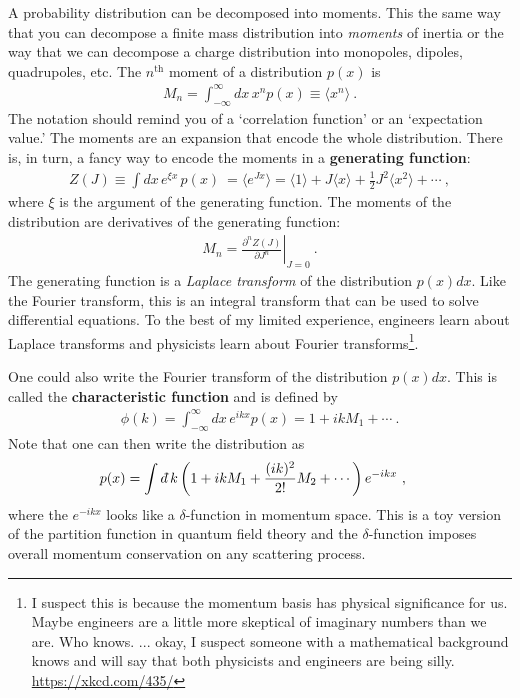 A probability distribution can be decomposed into moments. This the same way that you can decompose a finite mass distribution into \emph{moments} of inertia or the way that we can decompose a charge distribution into monopoles, dipoles, quadrupoles, etc. The $n^\text{th}$ moment of a distribution $p(x)$ is
\begin{align}
	M_n = \int_{-\infty}^\infty dx \, x^n p(x) \equiv \langle x^n \rangle \ .
\end{align}
The notation should remind you of a `correlation function' or an `expectation value.' The moments are an expansion that encode the whole distribution. There is, in turn, a fancy way to encode the moments in a \textbf{generating function}:
\begin{align}
	Z(J) \equiv \int dx\, e^{\xi x} \, p(x) \  
	= \langle e^{J x}\rangle
	= \langle 1 \rangle + J \langle x\rangle
	+ \frac{1}{2}J^2 \langle x^2\rangle + \cdots \ ,
	\label{eq:generating:function}
\end{align}
where $\xi$ is the argument of the generating function. The moments of the distribution are derivatives of the generating function:
\begin{align}
	M_n =
	\left.\frac{\partial^n Z(J)}{\partial J^n}\right|_{J = 0} \ .
\end{align}
The generating function is a \emph{Laplace transform} of the distribution $p(x)dx$. Like the Fourier transform, this is an integral transform that can be used to solve differential equations. To the best of my limited experience, engineers learn about Laplace transforms and physicists learn about Fourier transforms\footnote{I suspect this is because the momentum basis has physical significance for us. Maybe engineers are a little more skeptical of imaginary numbers than we are. Who knows. ... okay, I suspect someone with a mathematical background knows and will say that both physicists and engineers are being silly. \url{https://xkcd.com/435/}}.
\begin{example}
One could also write the Fourier transform of the distribution $p(x)dx$. This is called the \textbf{characteristic function} and is defined by
\begin{align}
	\phi(k) = \int_{-\infty}^\infty dx\, e^{ikx}p(x) = 1 + ikM_1 + \cdots \ .
\end{align}
Note that one can then write the distribution as
\begin{align}
	p(x) &= \int \dbar k\left( 1+ikM_1 + \frac{(ik)^2}{2!}M_2 + \cdots \right)e^{-ikx} \ ,
\end{align}
where the $e^{-ikx}$ looks like a $\delta$-function in momentum space. This is a toy version of the partition function in quantum field theory and the $\delta$-function imposes overall momentum conservation on any scattering process. 
\end{example}

